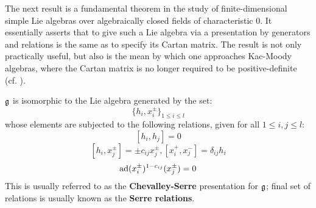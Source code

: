         The next result is a fundamental theorem in the study of finite-dimensional simple Lie algebras over algebraically closed fields of characteristic $0$. It essentially asserts that to give such a Lie algebra via a presentation by generators and relations is the same as to specify its Cartan matrix. The result is not only practically useful, but also is the mean by which one approaches Kac-Moody algebras, where the Cartan matrix is no longer required to be positive-definite (cf. \cite[Chapters 1-5]{kac_infinite_dimensional_lie_algebras}). 
        \begin{theorem}
            $\mathfrak{g}$ is isomorphic to the Lie algebra generated by the set:
                $$\{h_i, x_i^{\pm}\}_{1 \leq i \leq l}$$
            whose elements are subjected to the following relations, given for all $1 \leq i, j \leq l$:
                $$[h_i, h_j] = 0$$
                $$[h_i, x_j^{\pm}] = \pm c_{ij} x_j^{\pm}, [x_i^+, x_j^-] = \delta_{ij} h_i$$
                $$\mathrm{ad}(x_i^{\pm})^{1 - c_{ij}}(x_j^{\pm}) = 0$$
            This is usually referred to as the \textbf{Chevalley-Serre} presentation for $\mathfrak{g}$; final set of relations is usually known as the \textbf{Serre relations}.
        \end{theorem}

